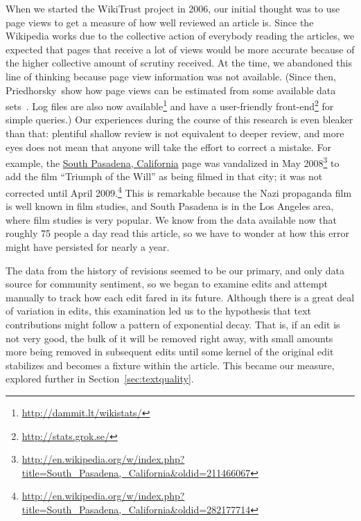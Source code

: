 When we started the WikiTrust project in 2006, our initial thought was to
use page views to get a measure of how well reviewed an article is.
Since the Wikipedia works due to the collective action of everybody
reading the articles, we expected that pages that receive a lot of
views would be more accurate because of the higher collective amount
of scrutiny received.
At the time, we abandoned this line of thinking because page view
information was not available.
(Since then, Priedhorsky~\etal show how page views can be estimated
from some available data sets~\cite{Priedhorsky2007}.
Log files are also now
available\footnote{\url{http://dammit.lt/wikistats/}} and
have a user-friendly front-end\footnote{\url{http://stats.grok.se/}}
for simple queries.)
Our experiences during the course of this research is even
bleaker than that: plentiful shallow review is not equivalent to
deeper review, and more eyes does not mean that anyone will take
the effort to correct a mistake.
For example, the \underline{South Pasadena, California} page was vandalized
in May 2008\footnote{\url{http://en.wikipedia.org/w/index.php?title=South_Pasadena,_California&oldid=211466067}}
to add the film ``Triumph of the Will'' as being filmed in that city;
it was not corrected until
April 2009.\footnote{\url{http://en.wikipedia.org/w/index.php?title=South_Pasadena,_California&oldid=282177714}}
This is remarkable because the Nazi propaganda film is well known in film studies,
and South Pasadena is in the Los Angeles area,
where film studies is very popular.
We know from the data available now that roughly 75 people a day
read this article, so we have to wonder at how this error might
have persisted for nearly a year.

The data from the history of revisions seemed to be our primary, and only
data source for community sentiment, so
we began to examine edits and attempt manually to track how each
edit fared in its future.
Although there is a great deal of variation in edits, this examination
led us to the hypothesis that text contributions might follow a pattern
of exponential decay.
That is, if an edit is not very good, the bulk of it will be removed
right away, with small amounts more being removed in subsequent edits
until some kernel of the original edit stabilizes and becomes a fixture
within the article.
This became our  measure, explored further in
Section~\ref{sec:textquality}.

